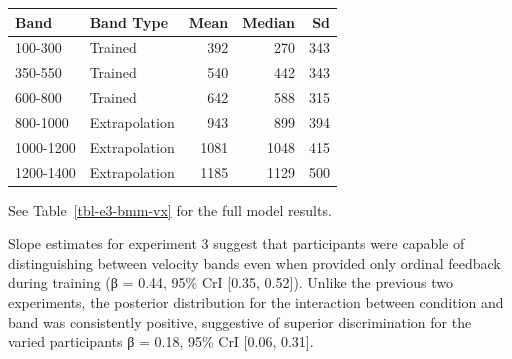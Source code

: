 \documentclass[
  letterpaper,
  DIV=11,
  numbers=noendperiod,
  oneside]{scrartcl}
\begin{document}
\begin{table}
{\begin{tabular}[t]{l|l|r|r|r}
\hline
Band & Band Type & Mean & Median & Sd\\
\hline
100-300 & Trained & 392 & 270 & 343\\
\hline
350-550 & Trained & 540 & 442 & 343\\
\hline
600-800 & Trained & 642 & 588 & 315\\
\hline
800-1000 & Extrapolation & 943 & 899 & 394\\
\hline
1000-1200 & Extrapolation & 1081 & 1048 & 415\\
\hline
1200-1400 & Extrapolation & 1185 & 1129 & 500\\
\hline
\end{tabular}

}

\end{table}%

\begin{table}

\caption{\label{tbl-e3-bmm-vx}Experiment 3. Bayesian Mixed Model
Predicting Vx as a function of condition (Constant vs.~Varied) and
Velocity Band}


\end{table}%

See Table~\ref{tbl-e3-bmm-vx} for the full model results.

Slope estimates for experiment 3 suggest that participants were capable
of distinguishing between velocity bands even when provided only ordinal
feedback during training (β = 0.44, 95\% CrI {[}0.35, 0.52{]}). Unlike
the previous two experiments, the posterior distribution for the
interaction between condition and band was consistently positive,
suggestive of superior discrimination for the varied participants β =
0.18, 95\% CrI {[}0.06, 0.31{]}.
\end{document}
